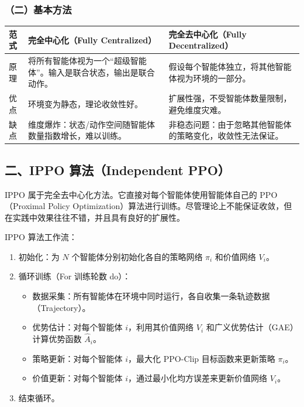 \hypertarget{ux4e8cux57faux672cux65b9ux6cd5}{%
\subsubsection{（二）基本方法}\label{ux4e8cux57faux672cux65b9ux6cd5}}

\begin{longtable}[]{@{}lll@{}}
\toprule
范式 & 完全中心化（Fully Centralized） & 完全去中心化（Fully Decentralized） \\
\midrule
\endhead
原理 & 将所有智能体视为一个``超级智能体''。输入是联合状态，输出是联合动作。 & 假设每个智能体独立，将其他智能体视为环境的一部分。 \\
优点 & 环境变为静态，理论收敛性好。 & 扩展性强，不受智能体数量限制，避免维度灾难。 \\
缺点 & 维度爆炸：状态/动作空间随智能体数量指数增长，难以训练。 & 非稳态问题：由于忽略其他智能体的策略变化，收敛性无法保证。 \\
\bottomrule
\end{longtable}

\hypertarget{ux4e8cippo-ux7b97ux6cd5independent-ppo}{%
\subsection{二、IPPO 算法（Independent PPO）}\label{ux4e8cippo-ux7b97ux6cd5independent-ppo}}

IPPO 属于完全去中心化方法。它直接对每个智能体使用智能体自己的 PPO（Proximal Policy Optimization）算法进行训练。尽管理论上不能保证收敛，但在实践中效果往往不错，并且具有良好的扩展性。

IPPO 算法工作流：

\begin{enumerate}
\def\labelenumi{\arabic{enumi}.}
\tightlist
\item
  初始化：为 \(N\) 个智能体分别初始化各自的策略网络 \(\pi_i\) 和价值网络 \(V_i\)。
\item
  循环训练（For 训练轮数 do）：

  \begin{itemize}
  \tightlist
  \item
    数据采集：所有智能体在环境中同时运行，各自收集一条轨迹数据（Trajectory）。
  \item
    优势估计：对每个智能体 \(i\)，利用其价值网络 \(V_i\) 和广义优势估计（GAE）计算优势函数 \(\hat{A}_i\)。
  \item
    策略更新：对每个智能体 \(i\)，最大化 PPO-Clip 目标函数来更新策略 \(\pi_i\)。
  \item
    价值更新：对每个智能体 \(i\)，通过最小化均方误差来更新价值网络 \(V_i\)。
  \end{itemize}
\item
  结束循环。
\end{enumerate}

